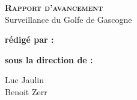 
\begingroup
\thispagestyle{empty}
\begin{center}
\vspace*{2cm}
{\Huge \textsc{\textbf{Rapport d'avancement}}}\\
\vspace*{2cm}
{\huge Surveillance du Golfe de Gascogne}\par %
\end{center}
\vspace*{4cm}

\textbf{\huge rédigé par :} 

\begin{center}
{
\huge

}
\end{center}

\vspace*{1cm}

{\huge \textbf{sous la direction de :}}\\
\begin{center}
{\huge
Luc Jaulin\\
Benoit Zerr\\
}
\end{center}
\endgroup
